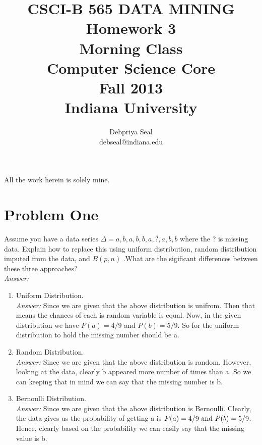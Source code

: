 \documentclass{article}
\begin{document}
\title{ CSCI-B 565 DATA MINING \\
Homework 3 \\
Morning Class\\
Computer Science Core\\Fall 2013\\Indiana University}
\author{ Debpriya Seal\\ debseal@indiana.edu}
\maketitle
All the work herein is solely mine. \\

\section*{Problem One}
		Assume you have a data series $ \Delta= a, b, a, b, b, a,? , a, b, b$ where the ? is missing data. Explain how to
replace this using uniform distribution, random distribution imputed from the data, and $B(p,n)$ .What are the sigificant differences between these three approaches? \\
	\emph{Answer:} 
	\begin{enumerate}
		\item Uniform Distribution.\\
		\emph{Answer:} Since we are given that the above distribution is unifrom. Then that means the chances of each is random variable is equal. Now, in the given distribution we have $P(a) = 4/9$ and $P(b) = 5/9$. So for the uniform distribution to hold the missing number should be a.

		\item Random Distribution.\\
		\emph{Answer:} Since we are given that the above distribution is random. However, looking at the data, clearly b appeared more number of times than a. So we can keeping that in mind we can say that the missing number is b.

		\item Bernoulli Distribution.\\
		\emph{Answer:} Since we are given that the above distribution is Bernoulli. Clearly, the data gives us the probability of 
getting a is $P(a) = 4/9 \text{ and } \\P(b) = 5/9$. Hence, clearly based on the probability we can easily say that the missing value is b.
	\end{enumerate}	
\end{document}
